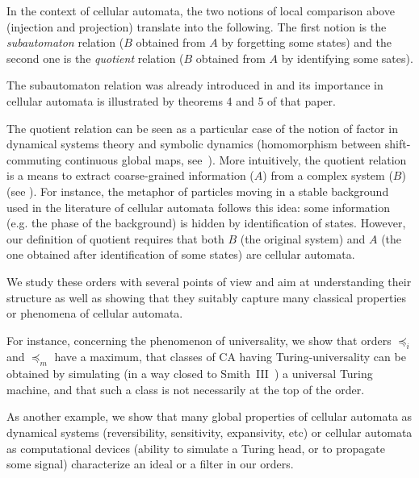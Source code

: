 \documentclass[a4paper]{elsarticle}
\newcommand{\simu}{\preccurlyeq}
\newcommand{\sacsimu}{\simu_i}
\newcommand{\facsacsimu}{\simu_m}
\begin{document}
In the context of cellular automata, the two notions of local
comparison above (injection and projection) translate into the
following.  The first notion is the \emph{subautomaton} relation ($B$
obtained from $A$ by forgetting some states) and the second one is the
\emph{quotient} relation ($B$ obtained from $A$ by identifying some
sates). 

The subautomaton relation was already introduced in \cite{bulking1}
and its importance in cellular automata is illustrated by theorems 4
and 5 of that paper. 

The quotient relation can be seen as a particular case of the notion
of factor in dynamical systems theory and symbolic dynamics
(homomorphism between shift-commuting continuous global maps,
see~\cite{LindMarcus}). More intuitively, the quotient relation is a
means to extract coarse-grained information ($A$) from a complex
system ($B$) (see \cite{physcoarsegrained}). For instance, the
metaphor of particles moving in a stable background used in the
literature of cellular automata\cite{Boccara} follows this idea: some
information (e.g. the phase of the background) is hidden by
identification of states. However, our definition of quotient requires
that both $B$ (the original system) and $A$ (the one obtained after
identification of some states) are cellular
automata. 



We study these orders with several points of view and aim at
understanding their structure as well as showing that they suitably
capture many classical properties or phenomena of cellular automata.

For instance, concerning the phenomenon of universality, we show that
orders $\sacsimu$ and $\facsacsimu$ have a maximum, that classes
of CA having Turing-universality can be obtained by simulating (in a
way closed to Smith~III~\cite{Smith:1971:SCU}) a universal Turing
machine, and that such a class is not necessarily at the top of the
order.

As another example, we show that many global properties of cellular
automata as dynamical systems (reversibility, sensitivity,
expansivity, etc) or cellular automata as computational devices
(ability to simulate a Turing head, or to propagate some signal) characterize
an ideal or a filter in our orders.
\end{document}
